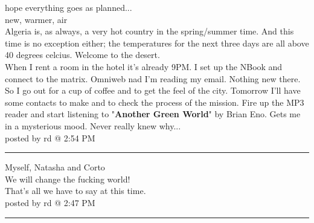 \documentclass[11pt,twoside,a4paper]{book}
\begin{document}
\begin{multicols*}{2}
    hope everything goes as planned... ~\\

    {\small new, warmer, air} ~\\

    Algeria is, as always, a very hot country in the spring/summer time. And this time is no exception either; the temperatures for the next three days are all above 40 degrees celcius. Welcome to the desert. ~\\

    When I rent a room in the hotel it's already 9PM. I set up the NBook and connect to the matrix. Omniweb nad I'm reading my email. Nothing new there. So I go out for a cup of coffee and to get the feel of the city. Tomorrow I'll have some contacts to make and to check the process of the mission. Fire up the MP3 reader and start listening to "\textbf{Another Green World}" by Brian Eno. Gets me in a mysterious mood. Never really knew why... ~\\

posted by rd @ 2:54 PM ~\\

\begin{center} \rule{0.45\textwidth}{0.001cm} \end{center}

{\large Myself, Natasha and Corto} ~\\

We will change the fucking world! ~\\

That's all we have to say at this time. ~\\

posted by rd @ 2:47 PM ~\\

\begin{center} \rule{0.45\textwidth}{0.001cm} \end{center}

\end{multicols*}

\clearpage
\end{document}

